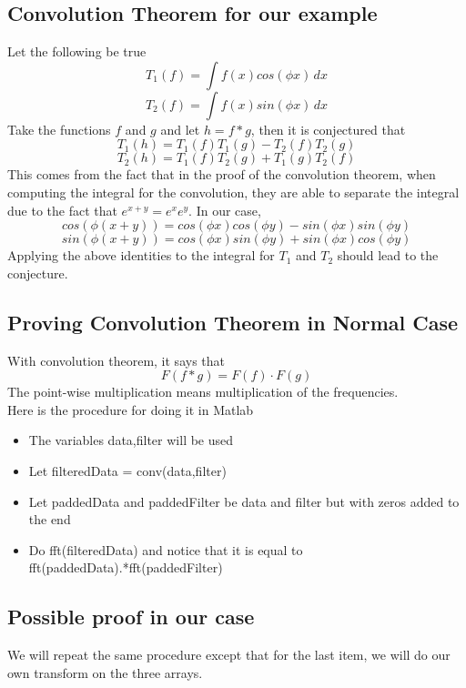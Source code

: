 \documentclass[11pt,psfig]{article}
\begin{document}
\setlength{\parskip}{1.2ex plus0.3ex minus 0.3ex}

\subsection*{Convolution Theorem for our example}

Let the following be true
\[
T_1(f) = \int{f(x) cos(\phi x) \,dx}
\]
\[
T_2(f) = \int{f(x) sin(\phi x) \,dx}
\]
Take the functions $f$ and $g$ and let $h = f*g$, then it is conjectured that
\[
T_1(h) = T_1(f) T_1(g) - T_2(f)T_2(g)
\]
\[
T_2(h) = T_1(f) T_2(g) + T_1(g)T_2(f)
\]
This comes from the fact that in the proof of the convolution theorem, when computing the integral for the convolution, they are able to separate the integral due to the fact that $e^{x+y} = e^x  e^y$. In our case,
\[
cos( \phi(x+y) ) = cos(\phi x)cos(\phi y) - sin(\phi x)sin(\phi y)
\]
\[
sin( \phi(x+y) ) = cos(\phi x)sin(\phi y) + sin(\phi x)cos(\phi y)
\]
Applying the above identities to the integral for $T_1$ and $T_2$ should lead to the conjecture. 
\\

\subsection*{Proving Convolution Theorem in Normal Case}
With convolution theorem, it says that
\[
F(f*g) = F(f) \cdot F(g)
\]
The point-wise multiplication means multiplication of the frequencies. \\

Here is the procedure for doing it in Matlab
\begin{itemize}
\item The variables data,filter will be used
\item Let filteredData = conv(data,filter)
\item Let paddedData and paddedFilter be data and filter but with zeros added to the end
\item Do fft(filteredData) and notice that it is equal to fft(paddedData).*fft(paddedFilter)
\end{itemize}

\subsection*{Possible proof in our case}

We will repeat the same procedure except that for the last item, we will do our own transform on the three arrays. 
\end{document}
